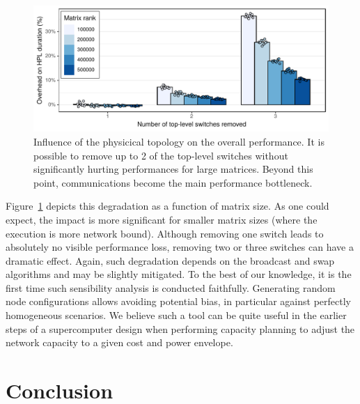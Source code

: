         \begin{figure}[htpb]
            \centering
            \includegraphics[width=\linewidth]{img/prediction/sensibility/topology/whatif_removing_switches.pdf}

            \caption{Influence of the physicical topology on the overall performance. It is possible to remove up to 2
            of the top-level switches without significantly hurting performances for large matrices. Beyond this point,
            communications become the main performance bottleneck.}
            \label{fig:whatif_removing_switches}
        \end{figure}

        Figure~\ref{fig:whatif_removing_switches} depicts this degradation as a function of matrix size. As one could
        expect, the impact is more significant for smaller matrix sizes (where the execution is more network bound).
        Although removing one switch leads to absolutely no visible performance loss, removing two or three switches can
        have a dramatic effect. Again, such degradation depends on the broadcast and swap algorithms and may be slightly
        mitigated. To the best of our knowledge, it is the first time such sensibility analysis is conducted faithfully.
        Generating random node configurations allows avoiding potential bias, in particular against perfectly
        homogeneous scenarios. We believe such a tool can be quite useful in the earlier steps of a supercomputer design
        when performing capacity planning to adjust the network capacity to a given cost and power envelope.

\chapter{Conclusion}%
\label{chapter:conclusion}

